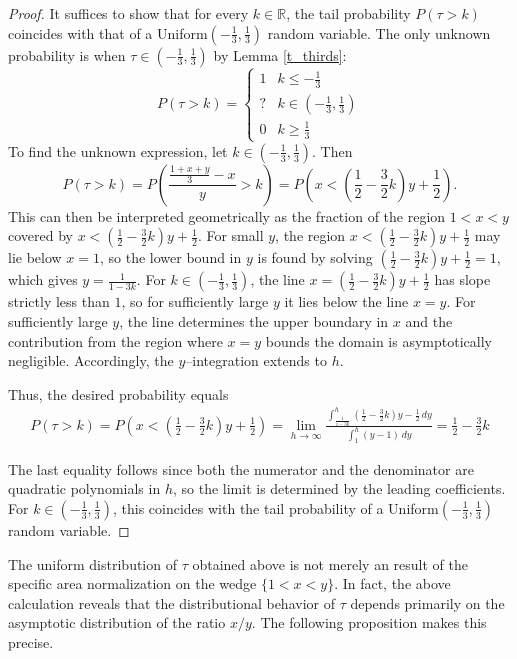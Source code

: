 \documentclass[11pt]{article}
\theoremstyle{definition}
\theoremstyle{definition}
\begin{document}
\begin{proof} It suffices to show that for every $k \in \mathbb{R}$, the tail probability $P(\tau > k)$ coincides with that of a Uniform$\left(-\frac13,\frac13 \right)$ random variable. The only unknown probability is when $\tau \in (-\frac13 , \frac13)$ by Lemma \ref{t_thirds}: 
$$P(\tau > k) = \left\{ \begin{array}{lcr}
1 & k \leq -\frac{1}{3} \\ ? & k \in \left( -\frac{1}{3}, \frac{1}{3} \right) \\ 0 & k \geq \frac{1}{3} \end{array} \right.$$
To find the unknown expression, let $k \in \left( -\frac{1}{3}, \frac{1}{3} \right)$. Then
$$ P\left(\tau>k\right) = P\left(\frac{\frac{1+x+y}{3}-x}{y}>k\right) = P\left(x<\left(\frac{1}{2}-\frac{3}{2}k\right)y + \frac12 \right). $$
This can then be interpreted geometrically as the fraction of the region $1<x<y$ covered by $x<\left(\frac{1}{2}-\frac{3}{2}k\right)y + \frac12$. For small $y$, the region $x<\left(\frac{1}{2}-\frac{3}{2}k\right)y + \frac12$ may lie below $x = 1$, so the lower bound in $y$ is found by solving $\left(\frac{1}{2}-\frac{3}{2}k\right)y + \frac12 = 1$, which gives $y = \frac{1}{1-3k}.$ For $k \in \left(-\frac13,\frac13\right)$, the line 
$x=\left(\frac12-\frac32k\right)y+\frac12$ has slope strictly less than $1$, so for sufficiently large $y$ it lies below the line $x=y$. For sufficiently large $y$, the line determines the upper boundary in $x$ and the contribution from the region where $x=y$ bounds the domain is asymptotically negligible. Accordingly, the $y$–integration extends to $h$.

Thus, the desired probability equals 
\begin{align*}
P(\tau > k) 
 = P\left(x<\left(\frac{1}{2}-\frac{3}{2}k\right)y+ \frac12\right) 
 = \lim_{h \to \infty} 
 \frac{ 
 \int_{\frac{1}{1-3k}}^h 
 \left(\frac{1}{2}-\frac{3}{2}k\right)y - \frac{1}{2} \,dy }{\int_1^h (y -1) \,dy}
 =\frac{1}{2} - \frac{3}{2}k
\end{align*}

The last equality follows since both the numerator and the denominator are quadratic polynomials in $h$, so the limit is determined by the leading coefficients. For $k \in \left(-\frac13,\frac13\right)$, this coincides with the tail probability of a Uniform$\left(-\frac13,\frac13\right)$ random variable.
\end{proof}

The uniform distribution of $\tau$ obtained above is not merely an result of the specific area normalization on the wedge $\{1<x<y\}$. In fact, the above calculation reveals that the distributional behavior of $\tau$ depends primarily on the asymptotic distribution of the ratio $x/y$. The following proposition makes this precise.
\end{document}
